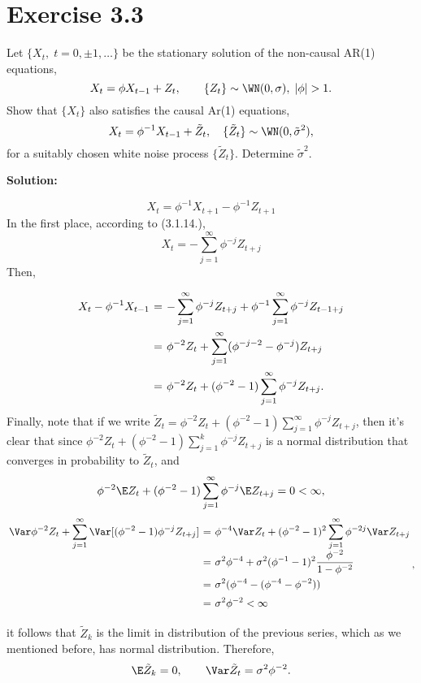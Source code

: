 \section*{Exercise 3.3}

Let $\{X_t,\; t = 0,\pm1,\ldots\}$ be the stationary solution of the non-causal AR(1) equations,
\[ X_t = \phi X_{t-1} + Z_t,\hspace{2em} \{Z_t\} \sim \WN(0,\sigma),\; |\phi| > 1. \]
Show that $ \{X_t\} $ also satisfies the causal Ar(1) equations,
\[  X_t = \phi^{-1} X_{t-1} + \tilde{Z}_t,\hspace{1em} \{\tilde{Z}_t\} \sim \WN (0,\tilde{\sigma}^{2}), \]
for a suitably chosen white noise process $\{\tilde{Z}_t\}$. Determine $\tilde{\sigma}^2$.

\textbf{Solution:}

\[ X_t = \phi^{-1} X_{t+1} - \phi^{-1} Z_{t+1}\]
In the first place, according to (3.1.14.),
\[ X_t = -\sum_{j = 1}^{\infty} \phi^{-j} Z_{t+j} \]
Then,
\[ \everymath{\displaystyle}
\arraycolsep=1.8pt\def\arraystretch{2.5}
\begin{array}{rcl}
    X_t - \phi^{-1} X_{t-1} & = & -\sum_{j = 1}^{\infty} \phi^{-j} Z_{t+j} + \phi^{-1} \sum_{j = 1}^{\infty} \phi^{-j} Z_{t-1+j}\\
    & = & \phi^{-2} Z_t + \sum_{j = 1}^{\infty} (\phi^{-j-2}-\phi^{-j})Z_{t+j}\\
    & = & \phi^{-2} Z_t + (\phi^{-2}-1) \sum_{j = 1}^{\infty}\phi^{-j}Z_{t+j}.
\end{array}\]
Finally, note that if we write $\tilde{Z}_t = \phi^{-2} Z_t + (\phi^{-2}-1) \sum_{j = 1}^{\infty}\phi^{-j}Z_{t+j}$, then it's clear that since $ \phi^{-2} Z_t + (\phi^{-2}-1) \sum_{j = 1}^{k}\phi^{-j}Z_{t+j} $ is a normal distribution that converges in probability to $\tilde{Z}_t$, and 
\[ \phi^{-2} \E Z_t + (\phi^{-2}-1) \sum_{j = 1}^{\infty}\phi^{-j}\E Z_{t+j} = 0 < \infty,  \]
\[ \everymath{\displaystyle}
\arraycolsep=1.8pt\def\arraystretch{1.5}
\begin{array}{rcl}
     \Var \phi^{-2} Z_t +  \sum_{j = 1}^{\infty}\Var [(\phi^{-2}-1) \phi^{-j}Z_{t+j}] & = & \phi^{-4} \Var  Z_t +  (\phi^{-2}-1)^2 \sum_{j = 1}^{\infty} \phi^{-2j}\Var Z_{t+j}\\
     & = & \sigma^{2} \phi^{-4} + \sigma^{2}(\phi^{-1}-1)^2 \frac{\phi^{-2}}{1-\phi^{-2}}\\
    & = & \sigma^2 (\phi^{-4} - (\phi^{-4} - \phi^{-2}))\\
    & = &  \sigma^2 \phi^{-2} < \infty
\end{array},  \]

it follows that $\tilde{Z}_k$ is the limit in distribution of the previous series, which as we mentioned before, has normal distribution. Therefore,
\[ \E \tilde{Z}_k = 0,\hspace{2em} \Var \tilde{Z}_t = \sigma^2 \phi^{-2}. \]
